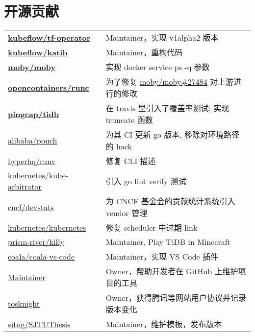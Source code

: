 \documentclass[]{deedy-resume-openfont}
\begin{document}
\begin{minipage}[t]{0.68\textwidth}
\section{开源贡献}
\begin{tabular}{ll}
\href{https://github.com/kubeflow/tf-operator/commits?author=gaocegege}{\bf kubeflow/tf-operator} & Maintainer，实现 v1alpha2 版本 \\
\href{https://github.com/kubeflow/katib/commits?author=gaocegege}{\bf kubeflow/katib} & Maintainer，重构代码 \\
\href{https://github.com/moby/moby/commits?author=gaocegege}{\bf moby/moby} & 实现 docker service ps -q 参数 \\
\href{https://github.com/opencontainers/runc/commits?author=gaocegege}{\bf opencontainers/runc} & 为了修复 \href{https://github.com/moby/moby/issues/27484}{moby/moby\#27484} 对上游进行的修改 \\
\href{https://github.com/pingcap/tidb/commits?author=gaocegege}{\bf pingcap/tidb} & 在 travis 里引入了覆盖率测试; 实现 truncate 函数 \\
\href{https://github.com/alibaba/pouch/commits?author=gaocegege}{alibaba/pouch} & 为其 CI 更新 go 版本, 移除对环境路径的 hack \\
\href{https://github.com/hyperhq/runv/commits?author=gaocegege}{hyperhq/runv} & 修复 CLI 描述 \\
\href{https://github.com/kubernetes-incubator/kube-arbitrator/commits?author=gaocegege}{kubernetes/kube-arbitrator} & 引入 go lint verify 测试\\
\href{https://github.com/cncf/devstats/commits?author=gaocegege}{cncf/devstats} & 为 CNCF 基金会的贡献统计系统引入 vendor 管理 \\
\href{https://github.com/kubernetes/kubernetes/commits?author=gaocegege}{kubernetes/kubernetes} & 修复 scheduler 中过期 link \\
\href{https://github.com/prism-river/killy}{prism-river/killy} & Maintainer, Play TiDB in Minecraft \\
\href{https://github.com/coala/coala-vs-code/commits/master?author=gaocegege}{coala/coala-vs-code} & Maintainer，实现 VS Code 插件 \\
\href{https://github.com/gaocegege/maintainer}{Maintainer} & Owner，帮助开发者在 GitHub 上维护项目的工具 \\
\href{https://github.com/siglt/tosknight}{tosknight} & Owner，获得腾讯等网站用户协议并记录版本变化 \\
\href{https://github.com/sjtug/SJTUThesis/commits?author=gaocegege}{sjtug/SJTUThesis} & Maintainer，维护模板，发布版本 \\

\end{tabular}
\end{minipage}
\end{document}
